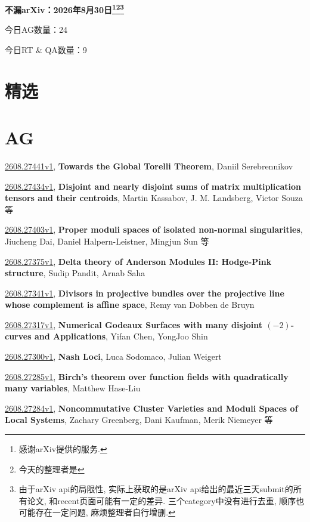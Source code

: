 \documentclass[9pt, a4paper]{article}
\theoremstyle{plain}
\theoremstyle{definition}
\theoremstyle{remark}
\newcommand{\arxiv}[3]{\href{https://arxiv.org/abs/#1}{#1}, \textbf{\textcolor{arxivblue}{#2}}, #3}
\newcommand{\AGnumber}{24}
\newcommand{\RTQAnumber}{9}
\newcommand{\NewestDate}{2026年8月30日}
\newcommand{\todayarXiver}{} %
\begin{document}
\begin{center}
    \Huge\textbf{不漏arXiv：\NewestDate\footnote{感谢arXiv提供的服务.}\footnote{今天的整理者是\todayarXiver}\footnote{由于arXiv api的局限性, 实际上获取的是arXiv api给出的最近三天submit的所有论文, 和recent页面可能有一定的差异. 三个category中没有进行去重, 顺序也可能存在一定问题, 麻烦整理者自行增删.}} \\
\end{center}

\setcounter{section}{-1}

\begin{center}
    今日AG数量：\AGnumber
    
    今日RT \& QA数量：\RTQAnumber
    
\end{center}


\section{精选}


\section{AG}
\arxiv{2608.27441v1}{Towards the Global Torelli Theorem}{Daniil Serebrennikov}

\arxiv{2608.27434v1}{Disjoint and nearly disjoint sums of matrix multiplication tensors and their centroids}{Martin Kassabov, J. M. Landsberg, Victor Souza 等}

\arxiv{2608.27403v1}{Proper moduli spaces of isolated non-normal singularities}{Jiucheng Dai, Daniel Halpern-Leistner, Mingjun Sun 等}

\arxiv{2608.27375v1}{Delta theory of Anderson Modules II: Hodge-Pink structure}{Sudip Pandit, Arnab Saha}

\arxiv{2608.27341v1}{Divisors in projective bundles over the projective line whose complement is affine space}{Remy van Dobben de Bruyn}

\arxiv{2608.27317v1}{Numerical Godeaux Surfaces with many disjoint $(-2)$-curves and Applications}{Yifan Chen, YongJoo Shin}

\arxiv{2608.27300v1}{Nash Loci}{Luca Sodomaco, Julian Weigert}

\arxiv{2608.27285v1}{Birch's theorem over function fields with quadratically many variables}{Matthew Hase-Liu}

\arxiv{2608.27284v1}{Noncommutative Cluster Varieties and Moduli Spaces of Local Systems}{Zachary Greenberg, Dani Kaufman, Merik Niemeyer 等}
\end{document}
